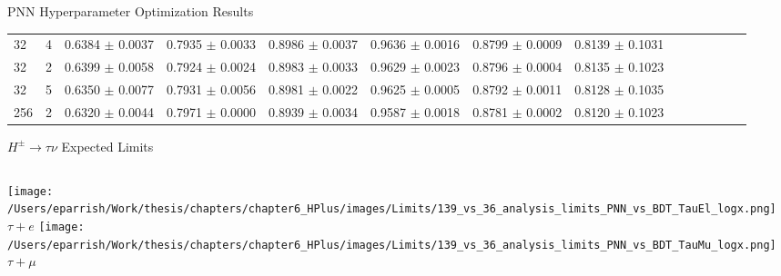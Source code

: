 \documentclass[aspectratio=169,xcolor=table]{beamer}
\begin{document}
\begin{frame}{PNN Hyperparameter Optimization Results}
\begin{table}
\begin{center}
{\begin{tabular}{llrrrrrrrrrrrr}
        32 &  4 & 0.6384  $\pm$ 0.0037  & 0.7935  $\pm$ 0.0033  & 0.8986  $\pm$ 0.0037  & 0.9636  $\pm$ 0.0016  & 0.8799  $\pm$ 0.0009  & 0.8139  $\pm$ 0.1031  \\
        32 &  2 & 0.6399  $\pm$ 0.0058  & 0.7924  $\pm$ 0.0024  & 0.8983  $\pm$ 0.0033  & 0.9629  $\pm$ 0.0023  & 0.8796  $\pm$ 0.0004  & 0.8135  $\pm$ 0.1023  \\
        32 &  5 & 0.6350  $\pm$ 0.0077  & 0.7931  $\pm$ 0.0056  & 0.8981  $\pm$ 0.0022  & 0.9625  $\pm$ 0.0005  & 0.8792  $\pm$ 0.0011  & 0.8128  $\pm$ 0.1035  \\
        256 & 2 & 0.6320  $\pm$ 0.0044  & 0.7971  $\pm$ 0.0000  & 0.8939  $\pm$ 0.0034  & 0.9587  $\pm$ 0.0018  & 0.8781  $\pm$ 0.0002  & 0.8120  $\pm$ 0.1023  \\
      \bottomrule
      \end{tabular}}
        \end{center}
    \end{table}
  \end{frame}

  \begin{frame}{$H^{\pm} \rightarrow \tau\nu$ Expected Limits}
    \centering
    \small
    \begin{columns}
      \centering
      \texttt{[image: /Users/eparrish/Work/thesis/chapters/chapter6\_HPlus/images/Limits/139\_vs\_36\_analysis\_limits\_PNN\_vs\_BDT\_TauEl\_logx.png]} \\
      \centering
      $\tau+e$
      \texttt{[image: /Users/eparrish/Work/thesis/chapters/chapter6\_HPlus/images/Limits/139\_vs\_36\_analysis\_limits\_PNN\_vs\_BDT\_TauMu\_logx.png]}\\
      \centering
      $\tau+\mu$
    \end{columns}
  \end{frame}
\end{document}

